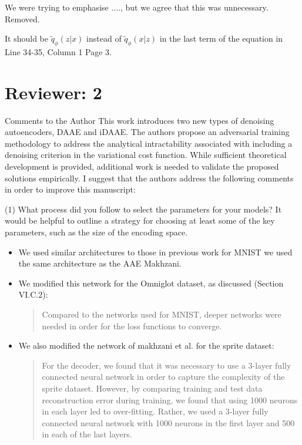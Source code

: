 \documentclass{article}
\begin{document}
We were trying to emphasise ...., but we agree that this was unnecessary.  Removed.

{\color{blue}
It should be $\tilde q_\phi(z|x)$ instead of $\tilde q_\phi(x|z)$ in the last term of the equation in Line 34-35, Column 1 Page 3. }


\section{Reviewer: 2}

Comments to the Author
{\color{blue}
This work introduces two new types of denoising autoencoders, DAAE and iDAAE. The authors propose an adversarial training methodology to address the analytical intractability associated with including a denoising criterion in the variational cost function. While sufficient theoretical development is provided, additional work is needed to validate the proposed solutions empirically. I suggest that the authors address the following comments in order to improve this manuscript:}\newline

{\color{blue}
(1) What process did you follow to select the parameters for your models? It would be helpful to outline a strategy for choosing at least some of the key parameters, such as the size of the encoding space. }\newline
\begin{itemize}
    \item We used similar architectures to those in previous work for MNIST we used the same architecture as the AAE {Makhzani}.
    \item We modified this network for the Omniglot dataset, as discussed (Section VI.C.2):
    \begin{quote}
        Compared  to  the  networks  used  for  MNIST,  deeper networks  were  needed  in  order  for  the  loss  functions  to converge.
    \end{quote}
    \item We also modified the network of makhzani et al. for the sprite dataset:
    \begin{quote}
        For  the  decoder,  we  found  that  it  was  necessary  to  use  a 3-layer  fully  connected  neural  network  in  order  to  capture the  complexity  of  the  sprite  dataset.  However,  by  comparing training and test data reconstruction error during training, we found that using 1000 neurons in each layer led to over-fitting. Rather, we used a 3-layer fully connected neural network with 1000 neurons  in  the  first  layer  and 500 in  each  of  the  last layers.
    \end{quote}
    
\end{itemize}
\end{document}
